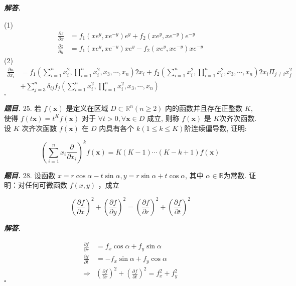 \documentclass[10pt, a4paper, oneside]{ctexart}
\newenvironment{problem}{\begin{framed}\par\noindent\textbf{\textit{题目. }}}{\end{framed}\par}
\newenvironment{solution}{%
  \par\noindent\textbf{\textit{解答. }}\ignorespaces
}{%
  \hfill\ensuremath{\square}\par %
}
\begin{document}
\begin{solution}
(1)
\begin{align*}
    \frac{\partial z}{\partial x}&=f_1(xe^y,xe^{-y})e^y+f_2(xe^y,xe^{-y})e^{-y}\\
    \frac{\partial z}{\partial y}&=f_1(xe^y,xe^{-y})xe^y-f_2(xe^y,xe^{-y})xe^{-y}
\end{align*}
(2)
\begin{align*}
    \frac{\partial u}{\partial x_i}&=f_1(\sum_{i=1}^n x_i^2, \prod_{i=1}^n x_i^2, x_3, \cdots, x_n)2x_i+f_2(\sum_{i=1}^n x_i^2, \prod_{i=1}^n x_i^2, x_3, \cdots, x_n)2x_i\Pi_{j\neq i}x_j^2\\&+\sum_{j=3}^{n}\delta_{ij}f_j(\sum_{i=1}^n x_i^2, \prod_{i=1}^n x_i^2, x_3, \cdots, x_n)
\end{align*}
\end{solution}

\begin{problem}
    25. 若 $f(\boldsymbol{x})$ 是定义在区域 $D \subset \mathbb{R}^n(n \geqslant 2)$ 内的函数并且存在正整数 $K$, 使得 $f(t \boldsymbol{x})=t^K f(\boldsymbol{x})$ 对于 $\forall t>0, \forall \boldsymbol{x} \in D$ 成立, 则称 $f(\boldsymbol{x})$ 是 $K$次齐次函数. 设 $K$ 次齐次函数 $f(\boldsymbol{x})$ 在 $D$ 内具有各个 $k(1 \leqslant k \leqslant K)$阶连续偏导数, 证明:

    $$
    \left(\sum_{i=1}^n x_i \frac{\partial}{\partial x_i}\right)^k f(\boldsymbol{x})=K(K-1) \cdots(K-k+1) f(\boldsymbol{x})
    $$
\end{problem}

\begin{problem}
    28. 设函数 $x=r \cos \alpha-t \sin \alpha, y=r \sin \alpha+t \cos \alpha$, 其中 $\alpha \in \mathbb{R}$为常数. 证明：对任何可微函数 $f(x, y)$ ，成立

    $$
    \left(\frac{\partial f}{\partial x}\right)^2+\left(\frac{\partial f}{\partial y}\right)^2=\left(\frac{\partial f}{\partial r}\right)^2+\left(\frac{\partial f}{\partial t}\right)^2
    $$    
\end{problem}
\begin{solution}
    \begin{align*}
        \frac{\partial f}{\partial r}&=f_x\cos \alpha+f_y\sin \alpha\\
        \frac{\partial f}{\partial t}&=-f_x\sin \alpha+f_y\cos \alpha\\
        \Rightarrow& (\frac{\partial f}{\partial r})^2+(\frac{\partial f}{\partial t})^2=f_x^2+f_y^2
    \end{align*}
\end{solution}
\end{document}
